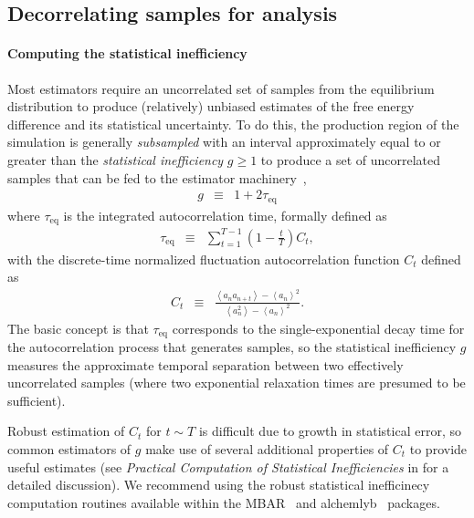 \documentclass[9pt,bestpractices]{livecoms}
\newcommand{\expect}[1]{\left\langle{#1}\right\rangle}
\begin{document}
\subsection*{Decorrelating samples for analysis}
\label{sec:decorrelating-samples}

\paragraph{Computing the statistical inefficiency}
Most estimators require an uncorrelated set of samples from the equilibrium distribution to produce (relatively) unbiased estimates of the free energy difference and its statistical uncertainty.
To do this, the production region of the simulation is generally \emph{subsampled} with an interval approximately equal to or greater than the \emph{statistical inefficiency} $g \ge 1$ to produce a set of uncorrelated samples that can be fed to the estimator machinery~\cite{chodera2016simple},
\begin{eqnarray}
g &\equiv& 1 + 2 \tau_\mathrm{eq} \label{eq:statistical-inefficiency-definition}
\end{eqnarray}
where $\tau_\mathrm{eq}$ is the integrated autocorrelation time, formally defined as
\begin{eqnarray}
\tau_\mathrm{eq} &\equiv& \sum_{t=1}^{T-1} \left(1 - \frac{t}{T}\right) C_t \label{eq:integrated-autocorrelation-time-definition} , 
\end{eqnarray}
with the discrete-time normalized fluctuation autocorrelation function $C_t$ defined as
\begin{eqnarray}
C_t &\equiv& \frac{\expect{a_n a_{n+t}} - \expect{a_n}^2}{\expect{a_n^2} - \expect{a_n}^2} . \label{equation:autocorrelation-definition}
\end{eqnarray}
The basic concept is that $\tau_\mathrm{eq}$ corresponds to the single-exponential decay time for the autocorrelation process that generates samples, so the statistical inefficiency $g$ measures the approximate temporal separation between two effectively uncorrelated samples (where two exponential relaxation times are presumed to be sufficient).

Robust estimation of $C_t$ for $t \sim T$ is difficult due to growth in statistical error, so common estimators of $g$ make use of several additional properties of $C_t$ to provide useful estimates (see \emph{Practical Computation of Statistical Inefficiencies} in \cite{chodera2016simple} for a detailed discussion).
We recommend using the robust statistical inefficinecy computation routines available within the MBAR~\cite{mbar} and alchemlyb~\cite{alchemlyb} packages.
\end{document}
